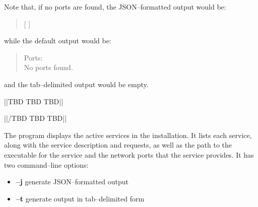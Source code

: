 Note that, if no ports are found, the JSON--formatted output would be:
\begin{quote}
[  ]
\end{quote}
while the default output would be:
\begin{quote}
Ports:\\
\settowidth{\utilLen}{Por}%
\hspace*{\utilLen}No ports found.
\end{quote}
and the tab--delimited output would be empty.



			||TBD TBD TBD||

			||/TBD TBD TBD||



The program  displays the active services in the \mplusm{}
installation.
It lists each service, along with the service description and requests, as well as the
path to the executable for the service and the \yarp{} network ports that the service
provides.
It has two command--line options:
\begin{itemize}
\item \textbf{--j} generate JSON--formatted output
\item \textbf{--t} generate output in tab--delimited form
\end{itemize}

